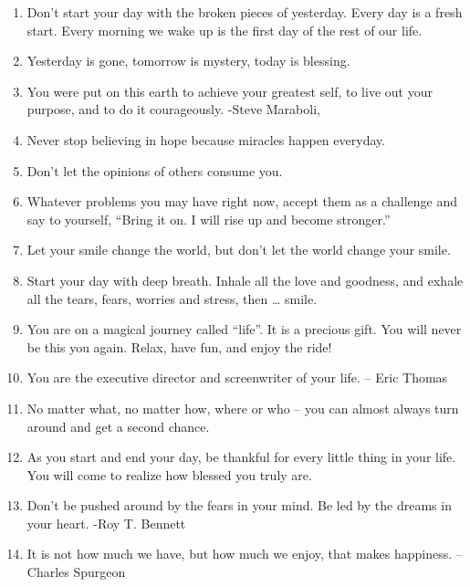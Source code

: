 \begin{enumerate}
            \item Don’t start your day with the broken pieces of yesterday. Every day is a fresh start. Every morning we wake up is the first day of the rest of our life.
            \item Yesterday is gone, tomorrow is mystery, today is blessing.

            \item You were put on this earth to achieve your greatest self, to live out your purpose, and to do it courageously. -Steve Maraboli,

            \item Never stop believing in hope because miracles happen everyday.

            \item Don’t let the opinions of others consume you.

            \item Whatever problems you may have right now, accept them as a challenge and say to yourself, “Bring it on. I will rise up and become stronger.”

            \item Let your smile change the world, but don’t let the world change your smile.

            \item Start your day with deep breath. Inhale all the love and goodness, and exhale all the tears, fears, worries and stress, then … smile.

            \item You are on a magical journey called “life”. It is a precious gift. You will never be this you again. Relax, have fun, and enjoy the ride!

            \item You are the executive director and screenwriter of your life. – Eric Thomas

            \item No matter what, no matter how, where or who – you can almost always turn around and get a second chance.

            \item As you start and end your day, be thankful for every little thing in your life. You will come to realize how blessed you truly are.

            \item Don’t be pushed around by the fears in your mind. Be led by the dreams in your heart. -Roy T. Bennett

            \item It is not how much we have, but how much we enjoy, that makes happiness. –Charles Spurgeon


\end{enumerate}
